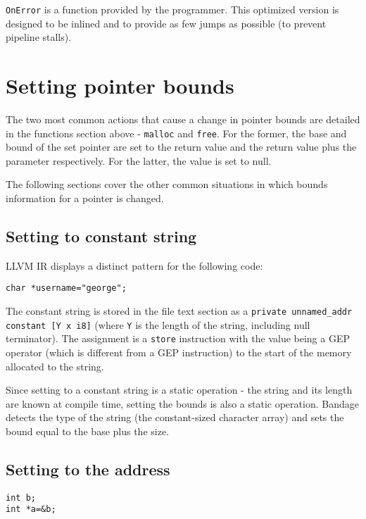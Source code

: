 \verb!OnError! is a function provided by the programmer.
This optimized version is designed to be inlined and to provide as few jumps as possible (to prevent pipeline stalls).

\section{Setting pointer bounds}

The two most common actions that cause a change in pointer bounds are detailed in the functions section above - \verb!malloc! and \verb!free!.
For the former, the base and bound of the set pointer are set to the return value and the return value plus the parameter respectively.
For the latter, the value is set to null.

The following sections cover the other common situations in which bounds information for a pointer is changed.

\subsection{Setting to constant string}

LLVM IR displays a distinct pattern for the following code:

\begin{verbatim}
char *username="george";
\end{verbatim}

The constant string is stored in the file text section as a \verb!private unnamed_addr constant [Y x i8]! (where \verb!Y! is the length of the string, including null terminator).
The assignment is a \verb!store! instruction with the value being a GEP operator (which is different from a GEP instruction) to the start of the memory allocated to the string.

Since setting to a constant string is a static operation - the string and its length are known at compile time, setting the bounds is also a static operation.
Bandage detects the type of the string (the constant-sized character array) and sets the bound equal to the base plus the size.

\subsection{Setting to the address}

\begin{verbatim}
int b;
int *a=&b;
\end{verbatim}

